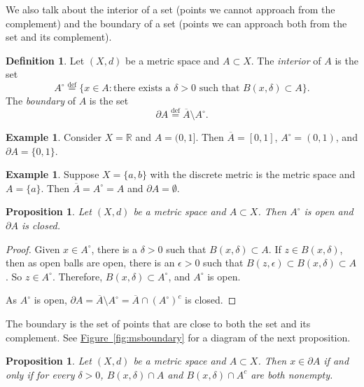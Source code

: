 \documentclass[12pt,openany]{book}
\newcommand{\widebar}[1]{\overline{#1}}
\newcommand{\glsadd}[2][]{}
\newcommand{\R}{{\mathbb{R}}}
\newcommand{\myindex}[1]{#1\index{#1}}
\theoremstyle{plain}
\newtheorem{prop}[thm]{Proposition}
\theoremstyle{remark}
\theoremstyle{definition}
\newtheorem{defn}[thm]{Definition}
\theoremstyle{exercise}
\theoremstyle{example}
\newtheorem{example}[thm]{Example}
\newcommand{\figureref}[1]{\hyperref[#1]{Figure~\ref*{#1}}}
\begin{document}
We also talk about the interior of a set
(points we cannot approach from the complement)
and the boundary of a set (points we can
approach both from the set and its complement).

\begin{defn}
Let $(X,d)$ be a metric space and $A \subset X$.
The \emph{\myindex{interior}} of $A$ is the set
\glsadd{not:interior}%
\begin{equation*}
A^\circ \overset{\text{def}}{=} \{ x \in A : \text{there exists a } \delta > 0
\text{ such that } B(x,\delta) \subset A \} .
\end{equation*}
The \emph{\myindex{boundary}} of $A$ is the set
\glsadd{not:boundary}%
\begin{equation*}
\partial A \overset{\text{def}}{=} \widebar{A}\setminus A^\circ.
\end{equation*}
\end{defn}

\begin{example}
Consider $X = \R$ and $A=(0,1]$.  Then $\widebar{A}=[0,1]$, $A^\circ = (0,1)$,
and $\partial A = \{ 0, 1 \}$.
\end{example}

\begin{example}
Suppose $X = \{ a, b \}$ with the discrete metric is the metric space
and
$A = \{ a \}$.  Then $\widebar{A} = A^\circ = A$ and $\partial A =
\emptyset$.
\end{example}


\begin{prop}
Let $(X,d)$ be a metric space and $A \subset X$.  Then $A^\circ$ is open
and $\partial A$ is closed.
\end{prop}

\begin{proof}
Given $x \in A^\circ$, there is a $\delta > 0$ such that $B(x,\delta)
\subset A$.  If $z \in B(x,\delta)$, then as open balls are open,
there is an $\epsilon > 0$ such that $B(z,\epsilon) \subset B(x,\delta)
\subset A$.  So $z \in A^\circ$.  Therefore, $B(x,\delta) \subset
A^\circ$, and $A^\circ$ is open.

As $A^\circ$ is open,
$\partial A = \widebar{A} \setminus A^\circ = \widebar{A} \cap
{(A^\circ)}^c$ is closed.
\end{proof}

The boundary is the set of points that are close to both the set and its
complement.  See \figureref{fig:msboundary} for a diagram
of the next proposition.

\begin{prop}
Let $(X,d)$ be a metric space and $A \subset X$.  Then $x \in \partial A$
if and only if for every $\delta > 0$,
$B(x,\delta) \cap A$ and
$B(x,\delta) \cap A^c$ are both nonempty.
\end{prop}
\end{document}
